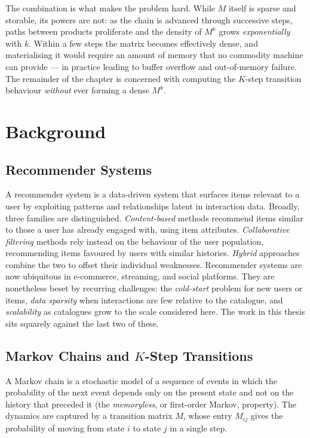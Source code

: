 The combination is what makes the problem hard. While $M$ itself is sparse and
storable, its powers are not: as the chain is advanced through successive
steps, paths between products proliferate and the density of $M^{k}$ grows
\emph{exponentially} with $k$. Within a few steps the matrix becomes
effectively dense, and materialising it would require an amount of memory that
no commodity machine can provide --- in practice leading to buffer overflow
and out-of-memory failure. The remainder of the chapter is concerned with
computing the $K$-step transition behaviour \emph{without} ever forming a
dense $M^{k}$.

\section{Background}
\label{sec:mf-background}

\subsection{Recommender Systems}
A recommender system is a data-driven system that surfaces items relevant to a
user by exploiting patterns and relationships latent in interaction data.
Broadly, three families are distinguished. \emph{Content-based} methods
recommend items similar to those a user has already engaged with, using item
attributes. \emph{Collaborative filtering} methods rely instead on the
behaviour of the user population, recommending items favoured by users with
similar histories. \emph{Hybrid} approaches combine the two to offset their
individual weaknesses. Recommender systems are now ubiquitous in e-commerce,
streaming, and social platforms. They are nonetheless beset by recurring
challenges: the \emph{cold-start} problem for new users or items, \emph{data
sparsity} when interactions are few relative to the catalogue, and
\emph{scalability} as catalogues grow to the scale considered here. The work
in this thesis sits squarely against the last two of these.

\subsection{Markov Chains and \texorpdfstring{$K$}{K}-Step Transitions}
\label{sec:markov}
A Markov chain is a stochastic model of a sequence of events in which the
probability of the next event depends only on the present state and not on the
history that preceded it (the \emph{memoryless}, or first-order Markov,
property). The dynamics are captured by a transition matrix $M$, whose entry
$M_{ij}$ gives the probability of moving from state $i$ to state $j$ in a
single step.


